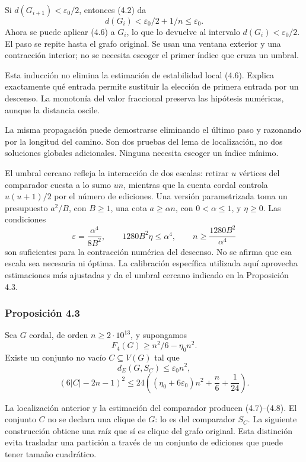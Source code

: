 \documentclass[spanish,11pt,a4paper]{article}
\begin{document}
Si \(d(G_{i+1})<\varepsilon_0/2\), entonces (4.2) da \[
d(G_i)<\varepsilon_0/2+1/n\le\varepsilon_0.
\] Ahora se puede aplicar (4.6) a \(G_i\), lo que lo devuelve al intervalo \(d(G_i)<\varepsilon_0/2\). El paso se repite hasta el grafo original. Se usan una ventana exterior y una contracción interior; no se necesita escoger el primer índice que cruza un umbral.

Esta inducción no elimina la estimación de estabilidad local (4.6). Explica exactamente qué entrada permite sustituir la elección de primera entrada por un descenso. La monotonía del valor fraccional preserva las hipótesis numéricas, aunque la distancia oscile.

La misma propagación puede demostrarse eliminando el último paso y razonando por la longitud del camino. Son dos pruebas del lema de localización, no dos soluciones globales adicionales. Ninguna necesita escoger un índice mínimo.

El umbral cercano refleja la interacción de dos escalas: retirar \(u\) vértices del comparador cuesta a lo sumo \(un\), mientras que la cuenta cordal controla \(u(u+1)/2\) por el número de ediciones. Una versión parametrizada toma un presupuesto \(a^2/B\), con \(B\ge1\), una cota \(a\ge\alpha n\), con \(0<\alpha\le1\), y \(\eta\ge0\). Las condiciones \[
\varepsilon=\frac{\alpha^4}{8B^2},\qquad
1280B^2\eta\le\alpha^4,\qquad
n\ge\frac{1280B^2}{\alpha^4}
\] son suficientes para la contracción numérica del descenso. No se afirma que esa escala sea necesaria ni óptima. La calibración específica utilizada aquí aprovecha estimaciones más ajustadas y da el umbral cercano indicado en la Proposición 4.3.

\subsubsection{Proposición 4.3}\label{proposiciuxf3n-4.3}

Sea \(G\) cordal, de orden \(n\ge2\cdot10^{13}\), y supongamos \[
F_4(G)\ge n^2/6-\eta_0n^2.
\] Existe un conjunto no vacío \(C\subseteq V(G)\) tal que \[
d_E(G,S_C)\le\varepsilon_0n^2,
\tag{4.7}
\] \[
(6|C|-2n-1)^2
\le24\left((\eta_0+6\varepsilon_0)n^2+\frac n6+\frac1{24}\right).
\tag{4.8}
\]

La localización anterior y la estimación del comparador producen (4.7)--(4.8). El conjunto \(C\) no se declara una clique de \(G\): lo es del comparador \(S_C\). La siguiente construcción obtiene una raíz que sí es clique del grafo original. Esta distinción evita trasladar una partición a través de un conjunto de ediciones que puede tener tamaño cuadrático.
\end{document}

